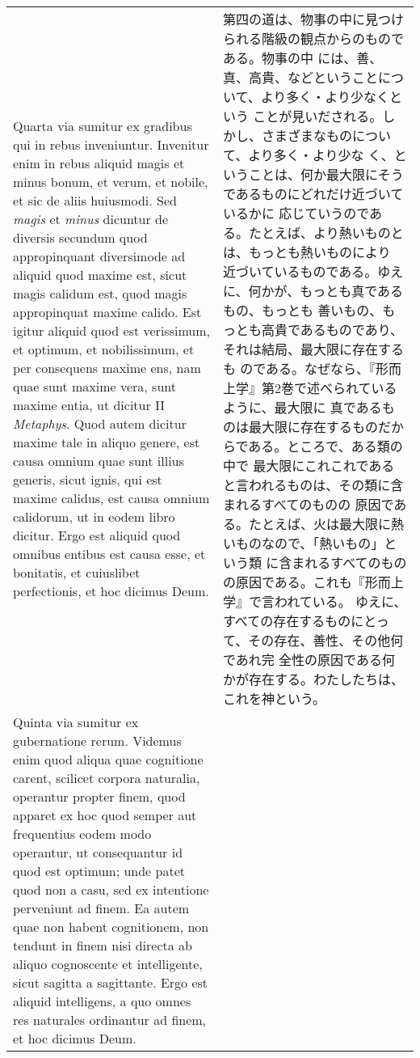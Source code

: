 \documentclass[10pt]{jsarticle}
\begin{document}
\begin{longtable}{p{21em}p{21em}}
\\

Quarta via sumitur ex gradibus qui in rebus inveniuntur. Invenitur
enim in rebus aliquid magis et minus bonum, et verum, et nobile, et
sic de aliis huiusmodi. Sed {\it magis} et {\it minus} dicuntur de
diversis secundum quod appropinquant diversimode ad aliquid quod
maxime est, sicut magis calidum est, quod magis appropinquat maxime
calido. Est igitur aliquid quod est verissimum, et optimum, et
nobilissimum, et per consequens maxime ens, nam quae sunt maxime vera,
sunt maxime entia, ut dicitur II {\it Metaphys}. Quod autem dicitur
maxime tale in aliquo genere, est causa omnium quae sunt illius
generis, sicut ignis, qui est maxime calidus, est causa omnium
calidorum, ut in eodem libro dicitur. Ergo est aliquid quod omnibus
entibus est causa esse, et bonitatis, et cuiuslibet perfectionis, et
hoc dicimus Deum.

&

第四の道は、物事の中に見つけられる階級の観点からのものである。物事の中
には、善、真、高貴、などということについて、より多く・より少なくという
ことが見いだされる。しかし、さまざまなものについて、より多く・より少な
く、ということは、何か最大限にそうであるものにどれだけ近づいているかに
応じていうのである。たとえば、より熱いものとは、もっとも熱いものにより
近づいているものである。ゆえに、何かが、もっとも真であるもの、もっとも
善いもの、もっとも高貴であるものであり、それは結局、最大限に存在するも
のである。なぜなら、『形而上学』第2巻で述べられているように、最大限に
真であるものは最大限に存在するものだからである。ところで、ある類の中で
最大限にこれこれであると言われるものは、その類に含まれるすべてのものの
原因である。たとえば、火は最大限に熱いものなので、「熱いもの」という類
に含まれるすべてのものの原因である。これも『形而上学』で言われている。
ゆえに、すべての存在するものにとって、その存在、善性、その他何であれ完
全性の原因である何かが存在する。わたしたちは、これを神という。

\\

Quinta via sumitur ex gubernatione rerum. Videmus enim quod aliqua
quae cognitione carent, scilicet corpora naturalia, operantur propter
finem, quod apparet ex hoc quod semper aut frequentius eodem modo
operantur, ut consequantur id quod est optimum; unde patet quod non a
casu, sed ex intentione perveniunt ad finem. Ea autem quae non habent
cognitionem, non tendunt in finem nisi directa ab aliquo cognoscente
et intelligente, sicut sagitta a sagittante. Ergo est aliquid
intelligens, a quo omnes res naturales ordinantur ad finem, et hoc
dicimus Deum.


\end{longtable}
\end{document}

